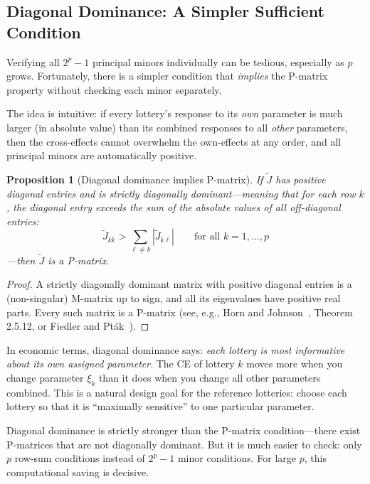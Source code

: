 \documentclass[11pt,a4paper]{article}
\newtheorem{proposition}[theorem]{Proposition}
\theoremstyle{definition}
\begin{document}
\subsection{Diagonal Dominance: A Simpler Sufficient Condition}

Verifying all $2^p - 1$ principal minors individually can be tedious,
especially as $p$ grows. Fortunately, there is a simpler condition that
\emph{implies} the P-matrix property without checking each minor separately.

The idea is intuitive: if every lottery's response to its \emph{own}
parameter is much larger (in absolute value) than its combined responses to
all \emph{other} parameters, then the cross-effects cannot overwhelm the
own-effects at any order, and all principal minors are automatically positive.

\begin{proposition}[Diagonal dominance implies P-matrix]
\label{prop:diag_dom}
If $\widetilde{J}$ has positive diagonal entries and is strictly diagonally
dominant---meaning that for each row $k$, the diagonal entry exceeds the sum
of the absolute values of all off-diagonal entries:
\begin{equation}
    \widetilde{J}_{kk} > \sum_{\ell \neq k} |\widetilde{J}_{k\ell}|
    \qquad \text{for all } k = 1, \ldots, p
\end{equation}
---then $\widetilde{J}$ is a P-matrix.
\end{proposition}

\begin{proof}
A strictly diagonally dominant matrix with positive diagonal entries is a
(non-singular) M-matrix up to sign, and all its eigenvalues have positive real
parts. Every such matrix is a P-matrix (see, e.g., Horn and
Johnson~\cite{horn_johnson_2012}, Theorem 2.5.12, or Fiedler and
Pt\'ak~\cite{fiedler_ptak_1962}).
\end{proof}

In economic terms, diagonal dominance says: \emph{each lottery is most
informative about its own assigned parameter}. The CE of lottery $k$ moves
more when you change parameter $\xi_k$ than it does when you change all other
parameters combined. This is a natural design goal for the reference lotteries:
choose each lottery so that it is ``maximally sensitive'' to one particular
parameter.

Diagonal dominance is strictly stronger than the P-matrix condition---there
exist P-matrices that are not diagonally dominant. But it is much easier to
check: only $p$ row-sum conditions instead of $2^p - 1$ minor conditions.
For large $p$, this computational saving is decisive.
\end{document}
